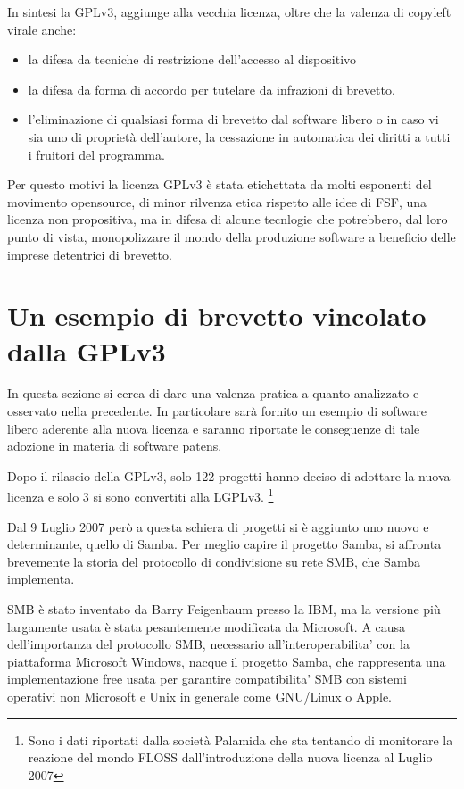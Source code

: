 In sintesi la GPLv3, aggiunge alla vecchia licenza, oltre che la valenza di copyleft virale anche:

\begin{itemize}
	\item  la difesa da tecniche di restrizione dell'accesso al dispositivo
	\item  la difesa da forma di accordo per tutelare da infrazioni di brevetto.
	\item  l'eliminazione di qualsiasi forma di brevetto dal software libero o in caso vi sia uno di proprietà dell'autore, la cessazione in automatica dei diritti a tutti i fruitori del programma.
\end{itemize}

Per questo motivi la licenza GPLv3 è stata etichettata da molti esponenti del movimento opensource, di minor rilvenza etica rispetto alle idee di FSF, una licenza non propositiva, ma in difesa di alcune tecnlogie che potrebbero, dal loro punto di vista, monopolizzare il mondo della produzione software a beneficio delle imprese detentrici di brevetto.





\section{Un esempio di brevetto vincolato dalla GPLv3}

In questa sezione si cerca di dare una valenza pratica a quanto analizzato e osservato nella precedente. In particolare sarà fornito un esempio di software libero aderente alla nuova licenza e saranno riportate le conseguenze di tale adozione in materia di software patens.

Dopo il rilascio della GPLv3, solo 122 progetti hanno deciso di adottare la nuova licenza e solo 3 si sono convertiti alla LGPLv3. \footnote{Sono i dati riportati dalla società Palamida che sta tentando di monitorare la reazione del mondo FLOSS dall’introduzione della nuova licenza al Luglio 2007}


Dal 9 Luglio 2007 però a questa schiera di progetti si è aggiunto uno nuovo e determinante, quello di Samba. Per meglio capire il progetto Samba, si affronta brevemente la storia del protocollo di condivisione su rete SMB, che Samba implementa.

SMB è stato inventato da Barry Feigenbaum presso la IBM, ma la versione più largamente usata è stata pesantemente modificata da Microsoft. A causa dell'importanza del protocollo SMB, necessario all'interoperabilita' con la piattaforma Microsoft Windows, nacque il progetto Samba, che rappresenta una implementazione free usata per garantire compatibilita' SMB con sistemi operativi non Microsoft e Unix in generale come GNU/Linux o Apple.

